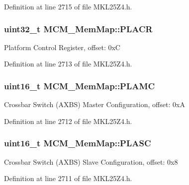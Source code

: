 Definition at line 2715 of file M\+K\+L25\+Z4.\+h.

\subsubsection[{\texorpdfstring{P\+L\+A\+CR}{PLACR}}]{\setlength{\rightskip}{0pt plus 5cm}uint32\+\_\+t M\+C\+M\+\_\+\+Mem\+Map\+::\+P\+L\+A\+CR}\hypertarget{struct_m_c_m___mem_map_a520575ffc4561724479404679213900b}{}\label{struct_m_c_m___mem_map_a520575ffc4561724479404679213900b}
Platform Control Register, offset\+: 0xC 

Definition at line 2713 of file M\+K\+L25\+Z4.\+h.

\subsubsection[{\texorpdfstring{P\+L\+A\+MC}{PLAMC}}]{\setlength{\rightskip}{0pt plus 5cm}uint16\+\_\+t M\+C\+M\+\_\+\+Mem\+Map\+::\+P\+L\+A\+MC}\hypertarget{struct_m_c_m___mem_map_a7d749b910777a6b67ea94f2379c628ee}{}\label{struct_m_c_m___mem_map_a7d749b910777a6b67ea94f2379c628ee}
Crossbar Switch (A\+X\+BS) Master Configuration, offset\+: 0xA 

Definition at line 2712 of file M\+K\+L25\+Z4.\+h.

\subsubsection[{\texorpdfstring{P\+L\+A\+SC}{PLASC}}]{\setlength{\rightskip}{0pt plus 5cm}uint16\+\_\+t M\+C\+M\+\_\+\+Mem\+Map\+::\+P\+L\+A\+SC}\hypertarget{struct_m_c_m___mem_map_ad68f64d82524bb0b181a837967b8e248}{}\label{struct_m_c_m___mem_map_ad68f64d82524bb0b181a837967b8e248}
Crossbar Switch (A\+X\+BS) Slave Configuration, offset\+: 0x8 

Definition at line 2711 of file M\+K\+L25\+Z4.\+h.

